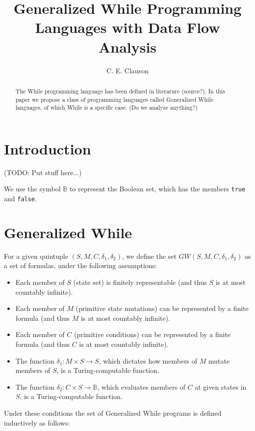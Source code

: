\documentclass[11pt]{article}
\begin{document}
\title{Generalized While Programming Languages with Data Flow Analysis}
\author{C. E. Clauson}
\maketitle

\begin{abstract}
The While programming language has been defined in literature (source?).  In this paper we propose a class of programming languages called Generalized While languages, of which While is a specific case.  (Do we analyze anything?)
\end{abstract}

\section{Introduction}
(TODO: Put stuff here...)

We use the symbol $\mathbb{B}$ to represent the Boolean set, which has the members \texttt{true} and \texttt{false}.

\section{Generalized While}
For a given quintuple $(S, M, C, \delta_{1}, \delta_{2})$, we define the set $GW(S, M, C, \delta_{1}, \delta_{2})$ as a set of formulas, under the following assumptions:

\begin{itemize}
\item Each member of $S$ (state set) is finitely representable (and thus $S$ is at most countably infinite).
\item Each member of $M$ (primitive state mutations) can be represented by a finite formula (and thus $M$ is at most countably infinite).
\item Each member of $C$ (primitive conditions) can be represented by a finite formula (and thus $C$ is at most countably infinite).
\item The function $\delta_{1} : M \times S \rightarrow S$, which dictates how members of $M$ mutate members of $S$, is a Turing-computable function. 
\item The function $\delta_{2} : C \times S \rightarrow \mathbb{B}$, which evaluates members of $C$ at given states in $S$, is a Turing-computable function.
\end{itemize}

Under these conditions the set of Generalized While programs is defined inductively as follows:
\end{document}
